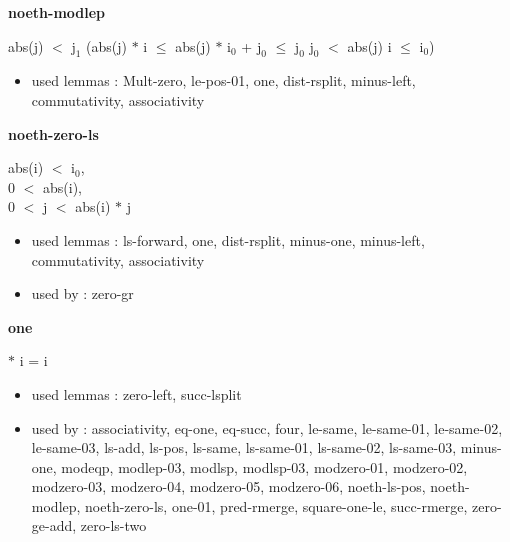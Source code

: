 \documentclass[a4paper]{article}
\begin{document}
\medskip

\bigskip

{\large\bf noeth-modlep}

\medskip

 \Fol abs(j) $<$ $\mbox{j}_{1}$ \Imp (abs(j) $*$ i $\le$ abs(j) $*$ $\mbox{i}_{0}$ + $\mbox{j}_{0}$  $\le$ $\mbox{j}_{0}$ \And $\mbox{j}_{0}$ $<$ abs(j) \Imp i $\le$ $\mbox{i}_{0}$)

\begin{itemize}


\item       used lemmas  : Mult-zero, le-pos-01, one, dist-rsplit, minus-left, commutativity, associativity

\end{itemize}

\medskip

\bigskip

{\large\bf noeth-zero-ls}

\medskip

abs(i) $<$ $\mbox{i}_{0}$, \\
0 $<$ abs(i), \\
0 $<$ j  $<$ abs(i) $*$ j

\begin{itemize}


\item       used lemmas  : ls-forward, one, dist-rsplit, minus-one, minus-left, commutativity, associativity
\item       used by      : zero-gr

\end{itemize}

\medskip

\bigskip

{\large\bf one}

\medskip

  $*$ i = i

\begin{itemize}


\item       used lemmas  : zero-left, succ-lsplit
\item       used by      : associativity, eq-one, eq-succ, four, le-same, le-same-01, le-same-02, le-same-03, ls-add, ls-pos, ls-same, ls-same-01, ls-same-02, ls-same-03, minus-one, modeqp, modlep-03, modlsp, modlsp-03, modzero-01, modzero-02, modzero-03, modzero-04, modzero-05, modzero-06, noeth-ls-pos, noeth-modlep, noeth-zero-ls, one-01, pred-rmerge, square-one-le, succ-rmerge, zero-ge-add, zero-ls-two

\end{itemize}
\end{document}
